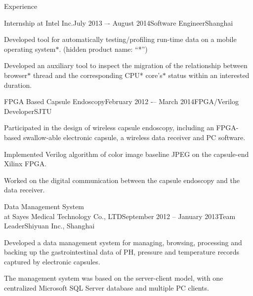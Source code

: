 \documentclass{resume} %
\begin{document}
\begin{rSection}{Experience}
    \begin{rSubsection}{Internship at Intel Inc.}{July 2013 –- August 2014}{Software Engineer}{Shanghai}

    \item Developed tool for automatically testing/profiling run-time data on a
        mobile operating system$*$. (hidden product name: ``*'')

    \item Developed an auxiliary tool to inspect the migration of the
        relationship between browser$*$ thread and the corresponding CPU*
        core's$*$ status within an interested duration.

    \end{rSubsection}

    \begin{rSubsection}{FPGA Based Capsule Endoscopy}{February 2012 -– March 2014}{FPGA/Verilog Developer}{SJTU}

    \item Participated in the design of wireless capsule endoscopy, including an
        FPGA-based swallow-able electronic capsule, a wireless data receiver and PC
        software.

    \item Implemented Verilog algorithm of color image baseline JPEG on the
        capsule-end Xilinx FPGA.

    \item Worked on the digital communication between the capsule endoscopy and
        the data receiver.

    \end{rSubsection}

    \begin{rSubsection}{Data Management System\\ at Sayes Medical Technology Co., LTD}{September 2012 -- January 2013}{Team Leader}{Shiyuan Inc., Shanghai}

    \item Developed a data management system for managing, browsing, processing
        and backing up the gastrointestinal data of PH, pressure and
        temperature records captured by electronic capsules.

    \item The management system was based on the server-client model, with one
        centralized Microsoft SQL Server database and multiple PC clients.

    \end{rSubsection}


\end{rSection}
\end{document}
